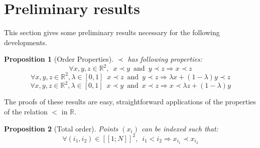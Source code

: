 \documentclass{meta}
\def\RR{{\mathbb{R}}}
\newtheorem{prop}{Proposition}
\begin{document}
\section{Preliminary results}


%  
%  
% 

This section gives some preliminary results necessary for the following developments.


\begin{prop}[Order Properties]\label{transitiv}
 $\prec$ has following properties:
 \begin{equation}\label{relTransitiv}
\forall x,y,z  \in \RR^2, \phantom{3} x \prec y \phantom{1} \mbox{and}\phantom{1} y \prec z \Longrightarrow x \prec z
\end{equation}
\begin{equation}
\forall x,y,z  \in \RR^2, \lambda \in [0,1] \phantom{3} x \prec z \phantom{1} \mbox{and}\phantom{1} y \prec z \Longrightarrow \lambda x + (1-\lambda) y \prec z
\end{equation}
\begin{equation}
\forall x,y,z  \in \RR^2, \lambda \in [0,1] \phantom{3} x \prec y \phantom{1} \mbox{and}\phantom{1} x \prec z \Longrightarrow x \prec \lambda z + (1-\lambda) y
\end{equation}
\end{prop}

 The proofs of these results are easy, straightforward applications of the properties of the relation $<$ in $\RR$.
\vskip 0.3cm


\begin{prop}[Total order]\label{reord}
Points $(x_i)$ can be indexed such that:
\begin{equation}\label{ordCroissant}
\forall (i_1,i_2) \in [\![1;N]\!]^2, \phantom{3} i_1<i_2 \Longrightarrow x_{i_1} \prec x_{i_2}
\end{equation}

\end{prop}
\end{document}
